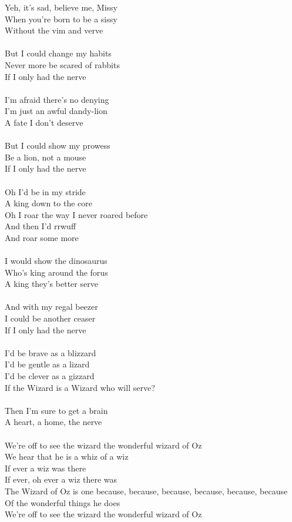 \documentclass{article}
\begin{document}
Yeh, it's sad, believe me, Missy\\
When you're born to be a sissy\\
Without the vim and verve\\
\hfill\\
But I could change my habits\\
Never more be scared of rabbits\\
If I only had the nerve\\
\hfill\\
I'm afraid there's no denying\\
I'm just an awful dandy-lion\\
A fate I don't deserve\\
\hfill\\
But I could show my prowess\\
Be a lion, not a mouse\\
If I only had the nerve\\
\hfill\\
Oh I'd be in my stride\\
A king down to the core\\
Oh I roar the way I never roared before\\
And then I'd rrwuff\\
And roar some more\\
\hfill\\
I would show the dinosaurus\\
Who's king around the forus\\
A king they's better serve\\
\hfill\\
And with my regal beezer\\
I could be another ceaser\\
If I only had the nerve\\
\hfill\\
I'd be brave as a blizzard\\
I'd be gentle as a lizard\\
I'd be clever as a gizzard\\
If the Wizard is a Wizard who will serve?\\
\hfill\\
Then I'm sure to get a brain\\
A heart, a home, the nerve\\
\hfill\\
We're off to see the wizard the wonderful wizard of Oz\\
We hear that he is a whiz of a wiz\\
If ever a wiz was there\\
If ever, oh ever a wiz there was\\
The Wizard of Oz is one because, because, because, because, because, because\\
Of the wonderful things he does\\
We're off to see the wizard the wonderful wizard of Oz\\
\end{document}
